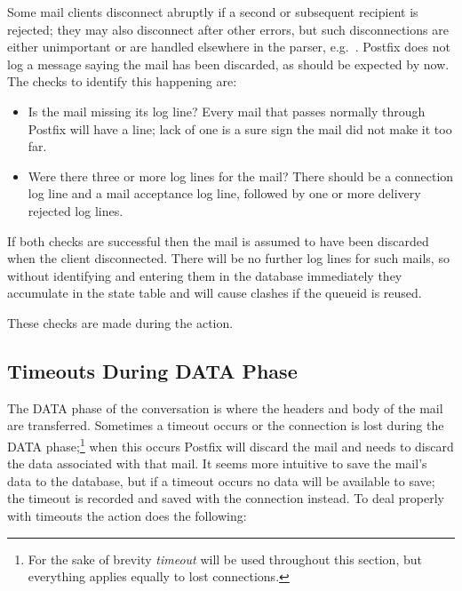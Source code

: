Some mail clients disconnect abruptly if a second or subsequent recipient
is rejected; they may also disconnect after other errors, but such
disconnections are either unimportant or are handled elsewhere in the
parser, e.g.\ .  Postfix does not
log a message saying the mail has been discarded, as should be expected by
now.  The checks to identify this happening are:

\begin{itemize}

    \item Is the mail missing its  log line?  Every mail
        that passes normally through Postfix will have a 
        line; lack of one is a sure sign the mail did not make it too far.

    \item Were there three or more  log lines for the mail?
        There should be a connection log line and a mail acceptance log
        line, followed by one or more delivery rejected log lines.

\end{itemize}

If both checks are successful then the mail is assumed to have been
discarded when the client disconnected.  There will be no further log lines
for such mails, so without identifying and entering them in the database
immediately they accumulate in the state table and will cause clashes if
the queueid is reused.

These checks are made during the  action.

\subsection{Timeouts During DATA Phase}

\label{timeouts during data phase}

The DATA phase of the  conversation is where the headers and
body of the mail are transferred.  Sometimes a timeout occurs or the
connection is lost during the DATA phase;\footnote{For the sake of brevity
\textit{timeout\/} will be used throughout this section, but everything
applies equally to lost connections.} when this occurs Postfix will discard
the mail and \parsername{} needs to discard the data associated with that
mail.  It seems more intuitive to save the mail's data to the database, but
if a timeout occurs no data will be available to save; the timeout is
recorded and saved with the connection instead.  To deal properly with
timeouts the  action does the following:

